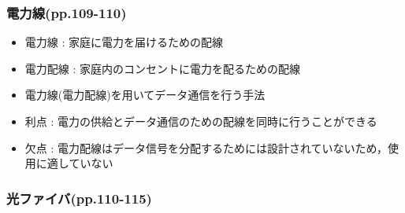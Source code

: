 \documentclass[a4paper]{ltjsarticle}
\begin{document}
		\subsubsection{電力線(pp.109-110)}
			\begin{itemize}
				\item 電力線 : 家庭に電力を届けるための配線
				\item 電力配線 : 家庭内のコンセントに電力を配るための配線
				\item 電力線(電力配線)を用いてデータ通信を行う手法
				\item 利点 : 電力の供給とデータ通信のための配線を同時に行うことができる
				\item 欠点 : 電力配線はデータ信号を分配するためには設計されていないため，使用に適していない
			\end{itemize}
		\subsubsection{光ファイバ(pp.110-115)}
\end{document}
